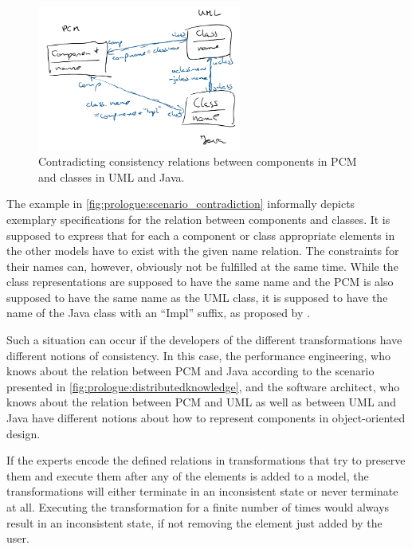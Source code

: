 \begin{figure}
    \centering
    \includegraphics[width=0.6\textwidth]{figures/prologue/scenario_contradiction.png}
    \caption[Example for transformation contradictions]{Contradicting consistency relations between components in \gls{PCM} and classes in \gls{UML} and Java.}
    \label{fig:prologue:scenario_contradiction}
\end{figure}

The example in \autoref{fig:prologue:scenario_contradiction} informally depicts exemplary specifications for the relation between components and classes.
It is supposed to express that for each a component or class appropriate elements in the other models have to exist with the given name relation.
The constraints for their names can, however, obviously not be fulfilled at the same time.
While the class representations are supposed to have the same name and the \gls{PCM} is also supposed to have the same name as the \gls{UML} class, it is supposed to have the name of the Java class with an \enquote{Impl} suffix, as proposed by \textcite{langhammer2017a}.

Such a situation can occur if the developers of the different transformations have different notions of consistency.
In this case, the performance engineering, who knows about the relation between \gls{PCM} and Java according to the scenario presented in \autoref{fig:prologue:distributedknowledge}, and the software architect, who knows about the relation between \gls{PCM} and \gls{UML} as well as between \gls{UML} and Java have different notions about how to represent components in object-oriented design.

If the experts encode the defined relations in transformations that try to preserve them and execute them after any of the elements is added to a model, the transformations will either terminate in an inconsistent state or never terminate at all.
Executing the transformation for a finite number of times would always result in an inconsistent state, if not removing the element just added by the user.


